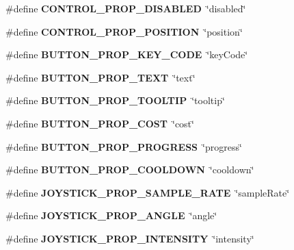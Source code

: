 \begin{DoxyCompactItemize}
\mbox{\label{group___interactivity_ga3f49eb18e75ebb475db9730ea92d4eff}} 
\#define {\bfseries C\+O\+N\+T\+R\+O\+L\+\_\+\+P\+R\+O\+P\+\_\+\+D\+I\+S\+A\+B\+L\+ED}~\char`\"{}disabled\char`\"{}
\item 
\mbox{\label{group___interactivity_gaeca1e1064c50ed768e7e1348d5623e5c}} 
\#define {\bfseries C\+O\+N\+T\+R\+O\+L\+\_\+\+P\+R\+O\+P\+\_\+\+P\+O\+S\+I\+T\+I\+ON}~\char`\"{}position\char`\"{}
\item 
\mbox{\label{group___interactivity_gad991b814cef295319da932ddca58d4bb}} 
\#define {\bfseries B\+U\+T\+T\+O\+N\+\_\+\+P\+R\+O\+P\+\_\+\+K\+E\+Y\+\_\+\+C\+O\+DE}~\char`\"{}key\+Code\char`\"{}
\item 
\mbox{\label{group___interactivity_gad9cee389183b815d55386599351889ac}} 
\#define {\bfseries B\+U\+T\+T\+O\+N\+\_\+\+P\+R\+O\+P\+\_\+\+T\+E\+XT}~\char`\"{}text\char`\"{}
\item 
\mbox{\label{group___interactivity_ga6b00599219891813b6aca3b37f3a4e7d}} 
\#define {\bfseries B\+U\+T\+T\+O\+N\+\_\+\+P\+R\+O\+P\+\_\+\+T\+O\+O\+L\+T\+IP}~\char`\"{}tooltip\char`\"{}
\item 
\mbox{\label{group___interactivity_gaaec771e30146fd4d3fbd754eba549624}} 
\#define {\bfseries B\+U\+T\+T\+O\+N\+\_\+\+P\+R\+O\+P\+\_\+\+C\+O\+ST}~\char`\"{}cost\char`\"{}
\item 
\mbox{\label{group___interactivity_ga7d5b4b96c956c9b7674d3886317f5fd0}} 
\#define {\bfseries B\+U\+T\+T\+O\+N\+\_\+\+P\+R\+O\+P\+\_\+\+P\+R\+O\+G\+R\+E\+SS}~\char`\"{}progress\char`\"{}
\item 
\mbox{\label{group___interactivity_ga531f8bda8a8e1da8416d57ca99a7d1b8}} 
\#define {\bfseries B\+U\+T\+T\+O\+N\+\_\+\+P\+R\+O\+P\+\_\+\+C\+O\+O\+L\+D\+O\+WN}~\char`\"{}cooldown\char`\"{}
\item 
\mbox{\label{group___interactivity_gac38d879ffa1ed03c06b9bd6e389975a1}} 
\#define {\bfseries J\+O\+Y\+S\+T\+I\+C\+K\+\_\+\+P\+R\+O\+P\+\_\+\+S\+A\+M\+P\+L\+E\+\_\+\+R\+A\+TE}~\char`\"{}sample\+Rate\char`\"{}
\item 
\mbox{\label{group___interactivity_ga32fa8936a4e80ab5219c5aab7a43703c}} 
\#define {\bfseries J\+O\+Y\+S\+T\+I\+C\+K\+\_\+\+P\+R\+O\+P\+\_\+\+A\+N\+G\+LE}~\char`\"{}angle\char`\"{}
\item 
\mbox{\label{group___interactivity_ga8a4ad3f70e95bad6429bf17e5eeb214c}} 
\#define {\bfseries J\+O\+Y\+S\+T\+I\+C\+K\+\_\+\+P\+R\+O\+P\+\_\+\+I\+N\+T\+E\+N\+S\+I\+TY}~\char`\"{}intensity\char`\"{}
\end{DoxyCompactItemize}
